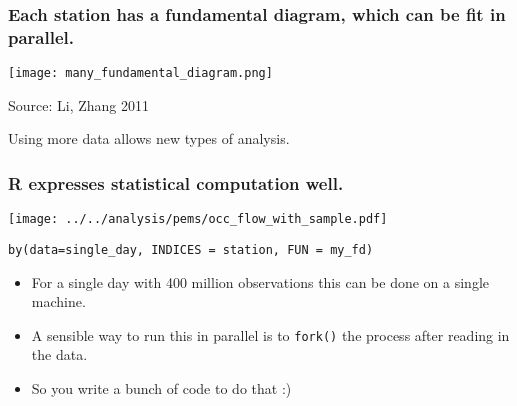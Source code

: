 \documentclass{beamer}
\begin{document}
\begin{frame}

    \frametitle{Each station has a fundamental diagram, which can be fit in
    parallel.}


\centerline{\texttt{[image: many\_fundamental\_diagram.png]}}

Source: Li, Zhang 2011

Using more data allows new types of analysis.

\end{frame}
\begin{frame}[fragile]

    \frametitle{R expresses statistical computation well.}


    \centerline{\texttt{[image: ../../analysis/pems/occ\_flow\_with\_sample.pdf]}}

\begin{verbatim}
by(data=single_day, INDICES = station, FUN = my_fd)
\end{verbatim}

    \pause

    \begin{itemize}
        \item For a single day with 400 million observations this can be
            done on a single machine.
        \item A sensible way to run this in parallel is to \texttt{fork()}
            the process after reading in the data.
        \item So you write a bunch of code to do that :)
    \end{itemize}

\end{frame}
\end{document}
